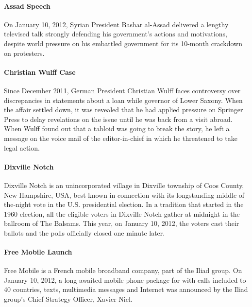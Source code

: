\documentclass{acm_proc_article-sp}
\newcommand{\inlinelistingsize}{\fontsize{8pt}{11pt}}
\let\oldurl\url
\renewcommand{\url}[1]{\inlinelistingsize\oldurl{#1}}
\begin{document}
\paragraph{Assad Speech}
On January 10, 2012, Syrian President Bashar al-Assad delivered a lengthy televised talk strongly defending his government's actions and motivations, despite world pressure on his embattled government for its 10-month crackdown on protesters. 

\paragraph{Christian Wulff Case}
Since December 2011, German President Christian Wulff faces controversy over discrepancies in statements about a loan while governor of Lower Saxony.
When the affair settled down, it was revealed that he had applied pressure on Springer Press to delay revelations on the issue until he was back from a visit abroad.
When Wulff found out that a tabloid was going to break the story, he left a message on the voice mail of the editor-in-chief in which he threatened to take legal action.

\paragraph{Dixville Notch}
Dixville Notch is an unincorporated village in Dixville township of Coos County, New Hampshire, USA, best known in connection with its longstanding middle-of-the-night vote in the U.S. presidential election.
In a tradition that started in the 1960 election, all the eligible voters in Dixville Notch gather at midnight in the ballroom of The Balsams.
This year, on January 10, 2012, the voters cast their ballots and the polls officially closed one minute later.

\paragraph{Free Mobile Launch}
Free Mobile is a French mobile broadband company, part of the Iliad group.
On January 10, 2012, a long-awaited mobile phone package for  with calls included to 40 countries, texts, multimedia messages and Internet was announced by the Iliad group's Chief Strategy Officer, Xavier Niel.
\end{document}
